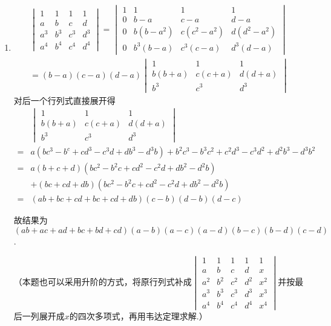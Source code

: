 \begin{enumerate}
    \item
    \begin{gather*}
    \begin{vmatrix}
    1 & 1 & 1 & 1 \\
    a & b & c & d \\
    a^3 & b^3 & c^3 & d^3 \\
    a^4 & b^4 & c^4 & d^4
    \end{vmatrix}
    =
    \begin{vmatrix}
    1 & 1 & 1 & 1 \\
    0 & b - a & c - a & d - a \\
    0 & b(b - a^2) & c(c^2 - a^2) & d(d^2 - a^2) \\
    0 & b^3(b - a) & c^3(c - a) & d^3(d - a)
    \end{vmatrix} \\
    = (b - a)(c - a)(d - a)
    \begin{vmatrix}
    1 & 1 & 1 \\
    b(b + a) & c(c + a) & d(d + a) \\
    b^3 & c^3 & d^3
    \end{vmatrix}
    \end{gather*}
    对后一个行列式直接展开得
    \begin{align*}
        &\begin{vmatrix}
        1 & 1 & 1 \\
        b(b + a) & c(c + a) & d(d + a) \\
        b^3 & c^3 & d^3
        \end{vmatrix} \\
        ={}& a(bc^3-b^c+cd^3-c^3d+db^3-d^3b)+b^2c^3-b^3c^2+c^2d^3-c^3d^2+d^2b^3-d^3b^2 \\
        ={}& a(b+c+d)(bc^2-b^2c+cd^2-c^2d+db^2-d^2b) \\
           &+(bc+cd+db)(bc^2-b^2c+cd^2-c^2d+db^2-d^2b) \\
        ={}& (ab+bc+cd+bc+cd+db)(c-b)(d-b)(d-c)
    \end{align*}

    故结果为 \((ab+ac+ad+bc+bd+cd)(a-b)(a-c)(a-d)(b-c)(b-d)(c-d)\).

    （本题也可以采用升阶的方式，将原行列式补成\(
        \begin{vmatrix}
            1 & 1 & 1 & 1 & 1 \\
            a & b & c & d & x \\
            a^2 & b^2 & c^2 & d^2 & x^2 \\
            a^3 & b^3 & c^3 & d^3 & x^3 \\
            a^4 & b^4 & c^4 & d^4 & x^4
            \end{vmatrix}
    \)并按最后一列展开成\(x\)的四次多项式，再用韦达定理求解.）


\end{enumerate}
